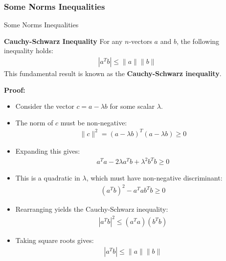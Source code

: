 \subsubsection{Some Norms Inequalities}
\begin{frame}{Some Norms Inequalities}
\begin{block}{\textbf{Cauchy-Schwarz Inequality}}
    For any $n$-vectors $a$ and $b$, the following inequality holds:
    \begin{align}
        |a^T b| \leq \|a\| \|b\|
    \end{align}
    This fundamental result is known as the \textbf{Cauchy-Schwarz inequality}.
\end{block}
\textbf{Proof:}
\begin{itemize}
    \item Consider the vector $c = a - \lambda b$ for some scalar $\lambda$.
    \item The norm of $c$ must be non-negative:
    \begin{align*}
        \|c\|^2 = (a - \lambda b)^T (a - \lambda b) \geq 0
    \end{align*}
\end{itemize}
\end{frame}

\begin{frame}
    \begin{itemize}
        \item Expanding this gives:
    \begin{align*}
        a^T a - 2\lambda a^T b + \lambda^2 b^T b \geq 0
    \end{align*}
    \item This is a quadratic in $\lambda$, which must have non-negative discriminant:
    \begin{align*}
        (a^T b)^2 - a^T a b^T b \geq 0
    \end{align*}
    \item Rearranging yields the Cauchy-Schwarz inequality:
    \begin{align*}
        |a^T b|^2 \leq (a^T a)(b^T b)
    \end{align*}
    \item Taking square roots gives:
    \begin{align*}
        |a^T b| \leq \|a\| \|b\|
    \end{align*}
    \end{itemize}
\end{frame}
  
